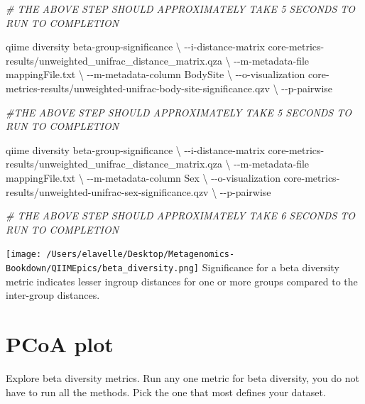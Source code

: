 \documentclass[
]{book}
\newenvironment{Shaded}{\begin{snugshade}}{\end{snugshade}}
\newcommand{\CommentTok}[1]{\textcolor[rgb]{0.56,0.35,0.01}{\textit{#1}}}
\newcommand{\DataTypeTok}[1]{\textcolor[rgb]{0.13,0.29,0.53}{#1}}
\newcommand{\ExtensionTok}[1]{#1}
\newcommand{\NormalTok}[1]{#1}
\begin{document}
\begin{Shaded}
\begin{Highlighting}[]
\CommentTok{\# THE ABOVE STEP SHOULD APPROXIMATELY TAKE 5 SECONDS TO RUN TO COMPLETION}

\ExtensionTok{qiime}\NormalTok{ diversity beta{-}group{-}significance }\DataTypeTok{\textbackslash{}}
\NormalTok{{-}{-}i{-}distance{-}matrix core{-}metrics{-}results/unweighted\_unifrac\_distance\_matrix.qza }\DataTypeTok{\textbackslash{}}
\NormalTok{{-}{-}m{-}metadata{-}file mappingFile.txt }\DataTypeTok{\textbackslash{}}
\NormalTok{{-}{-}m{-}metadata{-}column BodySite }\DataTypeTok{\textbackslash{}}
\NormalTok{{-}{-}o{-}visualization core{-}metrics{-}results/unweighted{-}unifrac{-}body{-}site{-}significance.qzv }\DataTypeTok{\textbackslash{}}
\NormalTok{{-}{-}p{-}pairwise}

\CommentTok{\#THE ABOVE STEP SHOULD APPROXIMATELY TAKE 5 SECONDS TO RUN TO COMPLETION}

\ExtensionTok{qiime}\NormalTok{ diversity beta{-}group{-}significance }\DataTypeTok{\textbackslash{}}
\NormalTok{{-}{-}i{-}distance{-}matrix core{-}metrics{-}results/unweighted\_unifrac\_distance\_matrix.qza }\DataTypeTok{\textbackslash{}}
\NormalTok{{-}{-}m{-}metadata{-}file mappingFile.txt }\DataTypeTok{\textbackslash{}}
\NormalTok{{-}{-}m{-}metadata{-}column Sex }\DataTypeTok{\textbackslash{}}
\NormalTok{{-}{-}o{-}visualization core{-}metrics{-}results/unweighted{-}unifrac{-}sex{-}significance.qzv }\DataTypeTok{\textbackslash{}}
\NormalTok{{-}{-}p{-}pairwise}

\CommentTok{\# THE ABOVE STEP SHOULD APPROXIMATELY TAKE 6 SECONDS TO RUN TO COMPLETION}
\end{Highlighting}
\end{Shaded}

\texttt{[image: /Users/elavelle/Desktop/Metagenomics-Bookdown/QIIMEpics/beta\_diversity.png]}
Significance for a beta diversity metric indicates lesser ingroup distances for one or more groups compared to the inter-group distances.

\hypertarget{pcoa-plot}{%
\section{PCoA plot}\label{pcoa-plot}}

Explore beta diversity metrics. Run any one metric for beta diversity, you do not have to run all the methods. Pick the one that most defines your dataset.
\end{document}
